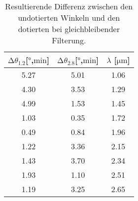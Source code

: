 \begin{table}
    \centering
    \caption{Resultierende Differenz zwischen den undotierten Winkeln und den dotierten bei gleichbleibender Filterung.}
    \label{tab:diff}
    \begin{tabular}{c c c}
    \toprule
    $\increment \theta_{1.2} $[$\si{\degree}$,$\si{\minute}$] & $\increment \theta_{2.8} $[$\si{\degree}$,$\si{\minute}$] & $\lambda$ [$\si{\micro\meter}$] \\
    \midrule
    5.27 & 5.01 & 1.06 \\
    4.30 & 3.53 & 1.29\\
    4.99 & 1.53 & 1.45\\
    1.03 & 0.35 & 1.72\\
    0.49 & 0.84 & 1.96\\
    1.22 & 3.36 & 2.15\\
    1.43 & 3.70 & 2.34\\
    1.93 & 1.10 & 2.51\\
    1.19 & 3.25 & 2.65\\
    \end{tabular}
\end{table}